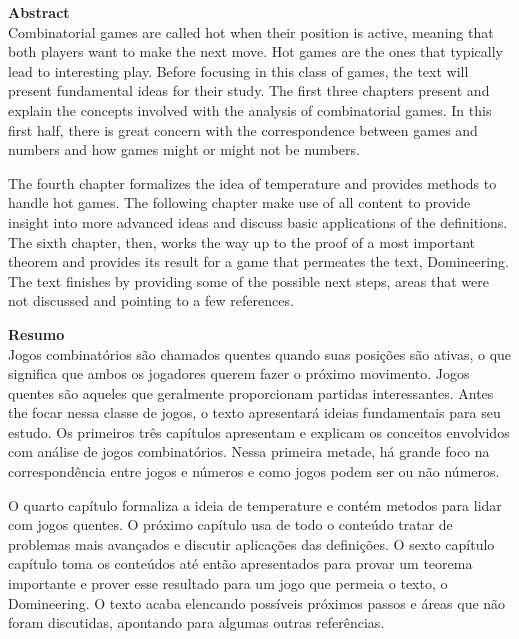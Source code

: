 \newpage

{
\noindent\Large\textbf{Abstract}
}\\


\noindent
Combinatorial games are called hot when their position is active, meaning that both players want to make the next move. Hot games are the ones that typically lead to interesting play. Before focusing in this class of games, the text will present fundamental ideas for their study. The first three chapters present and explain the concepts involved with the analysis of combinatorial games. In this first half, there is great concern with the correspondence between games and numbers and how games might or might not be numbers.

The fourth chapter formalizes the idea of temperature and provides methods to handle hot games. The following chapter make use of all content to provide insight into more advanced ideas and discuss basic applications of the definitions. The sixth chapter, then, works the way up to the proof of a most important theorem and provides its result for a game that permeates the text, Domineering. The text finishes by providing some of the possible next steps, areas that were not discussed and pointing to a few references.

\newpage

{
\noindent\Large\textbf{Resumo}
}\\


\noindent
Jogos combinatórios são chamados quentes quando suas posições são ativas, o que significa que ambos os jogadores querem fazer o próximo movimento. Jogos quentes são aqueles que geralmente proporcionam partidas interessantes. Antes the focar nessa classe de jogos, o texto apresentará ideias fundamentais para seu estudo. Os primeiros três capítulos apresentam e explicam os conceitos envolvidos com análise de jogos combinatórios. Nessa primeira metade, há grande foco na correspondência entre jogos e números e como jogos podem ser ou não números.


O quarto capítulo formaliza a ideia de temperature e contém metodos para lidar com jogos quentes. O próximo capítulo usa de todo o conteúdo tratar de problemas mais avançados e discutir aplicações das definições. O sexto capítulo capítulo toma os conteúdos até então apresentados para provar um teorema importante e prover esse resultado para um jogo que permeia o texto, o Domineering. O texto acaba elencando possíveis próximos passos e áreas que não foram discutidas, apontando para algumas outras referências.